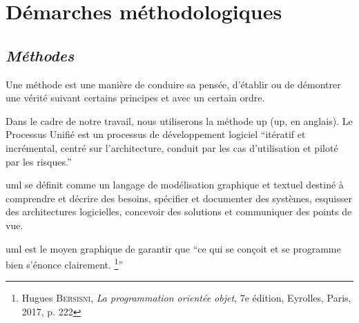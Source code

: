     \section[Démarches méthodologiques]{Démarches méthodologiques}
        \subsection[Méthodes]{\textit{Méthodes}}
        Une méthode est une manière de conduire sa pensée, d’établir ou de démontrer une
        vérité suivant certains principes et avec un certain ordre.
        \par
        Dans le cadre de notre travail, nous utiliserons la méthode \acrshort{up} (\acrlong{up}, en anglais).
        Le Processus Unifié est un processus de développement logiciel \enquote{itératif et incrémental,
        centré sur l’architecture, conduit par les cas d’utilisation et piloté par les risques.} \cite{Roques2008}
        \par
        \acrshort{uml} se définit comme un langage de modélisation graphique et textuel destiné à
        comprendre et décrire des besoins, spécifier et documenter des systèmes, esquisser des
        architectures logicielles, concevoir des solutions et communiquer des points de vue. \cite{RoqVall2007}
        \par
        \acrshort{uml} est le moyen graphique de garantir que \enquote{ce qui se conçoit et se programme
        bien s’énonce clairement. \footnote[2]{Hugues \textsc{Bersisni}, \textit{La programmation orientée objet}, 7e édition, Eyrolles, Paris, 2017, p. 222}}
